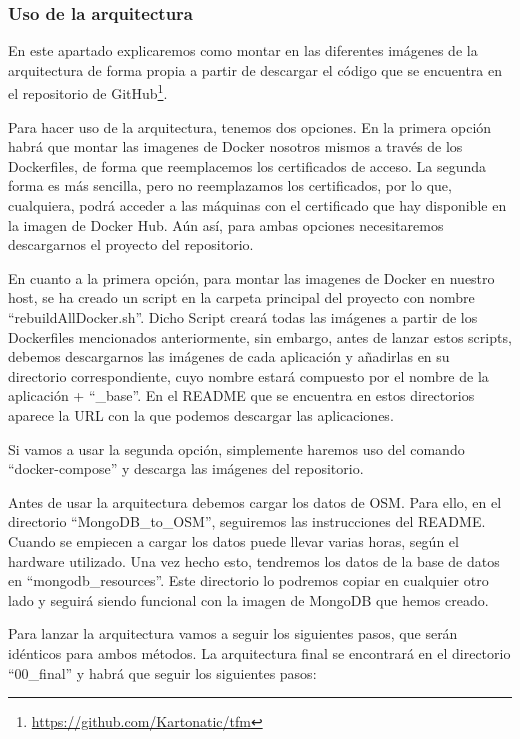 \subsubsection {Uso de la arquitectura \label{uso}} 

En este apartado explicaremos como montar en las diferentes imágenes de la arquitectura de forma propia a partir de descargar el código que se encuentra en el repositorio de GitHub\footnote{\url{https://github.com/Kartonatic/tfm}}.\par

Para hacer uso de la arquitectura, tenemos dos opciones. En la primera opción habrá que montar las imagenes de Docker nosotros mismos a través de los Dockerfiles, de forma que reemplacemos los certificados de acceso. La segunda forma es más sencilla, pero no reemplazamos los certificados, por lo que, cualquiera, podrá acceder a las máquinas con el certificado que hay disponible en la imagen de Docker Hub. Aún así, para ambas opciones necesitaremos descargarnos el proyecto del repositorio.\par

En cuanto a la primera opción, para montar las imagenes de Docker en nuestro host, se ha creado un script en la carpeta principal del proyecto con nombre “rebuildAllDocker.sh”. Dicho Script creará todas las imágenes a partir de los Dockerfiles mencionados anteriormente, sin embargo, antes de lanzar estos scripts, debemos descargarnos las imágenes de cada aplicación y añadirlas en su directorio correspondiente, cuyo nombre estará compuesto por el nombre de la aplicación + “\_base”. En el README que se encuentra en estos directorios aparece la URL con la que podemos descargar las aplicaciones. \par

Si vamos a usar la segunda opción, simplemente haremos uso del comando “docker-compose” y descarga las imágenes del repositorio.\par

Antes de usar la arquitectura debemos cargar los datos de OSM. Para ello, en el directorio “MongoDB\_to\_OSM”, seguiremos las instrucciones del README. Cuando se empiecen a cargar los datos puede llevar varias horas, según el hardware utilizado. Una vez hecho esto, tendremos los datos de la base de datos en “mongodb\_resources”. Este directorio lo podremos copiar en cualquier otro lado y seguirá siendo funcional con la imagen de MongoDB que hemos creado.\par

Para lanzar la arquitectura vamos a seguir los siguientes pasos, que serán idénticos para ambos métodos. La arquitectura final se encontrará en el directorio “00\_final” y habrá que seguir los siguientes pasos:

